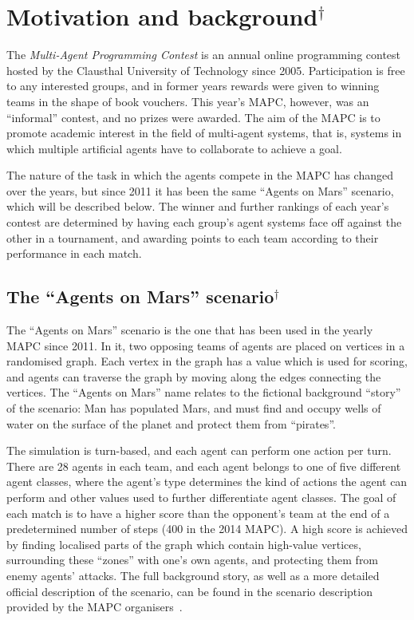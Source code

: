 \section{Motivation and background$^\dagger$}
The \emph{Multi-Agent Programming Contest} is an annual online programming contest hosted by the Clausthal University of Technology since 2005.
Participation is free to any interested groups, and in former years rewards were given to winning teams in the shape of book vouchers.
This year's MAPC, however, was an \enquote{informal} contest, and no prizes were awarded.
The aim of the MAPC is to promote academic interest in the field of multi-agent systems, that is, systems in which multiple artificial agents have to collaborate to achieve a goal.

The nature of the task in which the agents compete in the MAPC has changed over the years, but since 2011 it has been the same \enquote{Agents on Mars} scenario, which will be described below.
The winner and further rankings of each year's contest are determined by having each group's agent systems face off against the other in a tournament, and awarding points to each team according to their performance in each match.

\subsection{The \enquote{Agents on Mars} scenario$^\dagger$}
The \enquote{Agents on Mars} scenario is the one that has been used in the yearly MAPC since 2011.
In it, two opposing teams of agents are placed on vertices in a randomised graph.
Each vertex in the graph has a value which is used for scoring, and agents can traverse the graph by moving along the edges connecting the vertices.
The \enquote{Agents on Mars} name relates to the fictional background \enquote{story} of the scenario: Man has populated Mars, and must find and occupy wells of water on the surface of the planet and protect them from \enquote{pirates}.

The simulation is turn-based, and each agent can perform one action per turn.
There are 28 agents in each team, and each agent belongs to one of five different agent classes, where the agent's type determines the kind of actions the agent can perform and other values used to further differentiate agent classes.
The goal of each match is to have a higher score than the opponent's team at the end of a predetermined number of steps (400 in the 2014 MAPC).
A high score is achieved by finding localised parts of the graph which contain high-value vertices, surrounding these \enquote{zones} with one's own agents, and protecting them from enemy agents' attacks.
The full background story, as well as a more detailed official description of the scenario, can be found in the scenario description provided by the MAPC organisers~\cite{ahlbrecht_mapc_2014}.

